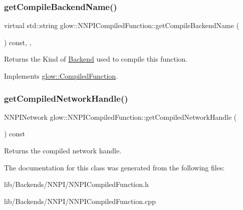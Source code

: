 \subsubsection{\texorpdfstring{get\+Compile\+Backend\+Name()}{getCompileBackendName()}}
{\footnotesize\ttfamily virtual std\+::string glow\+::\+N\+N\+P\+I\+Compiled\+Function\+::get\+Compile\+Backend\+Name (\begin{DoxyParamCaption}{ }\end{DoxyParamCaption}) const\hspace{0.3cm}{\ttfamily [inline]}, {\ttfamily [override]}, {\ttfamily [virtual]}}

\begin{DoxyReturn}{Returns}
the Kind of \hyperlink{classglow_1_1_backend}{Backend} used to compile this function. 
\end{DoxyReturn}


Implements \hyperlink{classglow_1_1_compiled_function_a7b3f2b17986d14706a1d1091d3c4df27}{glow\+::\+Compiled\+Function}.

\mbox{\label{classglow_1_1_n_n_p_i_compiled_function_a54cda1e7ddc8111a0c8754ac4e749399}} 
\subsubsection{\texorpdfstring{get\+Compiled\+Network\+Handle()}{getCompiledNetworkHandle()}}
{\footnotesize\ttfamily N\+N\+P\+I\+Network glow\+::\+N\+N\+P\+I\+Compiled\+Function\+::get\+Compiled\+Network\+Handle (\begin{DoxyParamCaption}{ }\end{DoxyParamCaption}) const\hspace{0.3cm}{\ttfamily [inline]}}

\begin{DoxyReturn}{Returns}
the compiled network handle. 
\end{DoxyReturn}


The documentation for this class was generated from the following files\+:\begin{DoxyCompactItemize}
\item 
lib/\+Backends/\+N\+N\+P\+I/N\+N\+P\+I\+Compiled\+Function.\+h\item 
lib/\+Backends/\+N\+N\+P\+I/N\+N\+P\+I\+Compiled\+Function.\+cpp\end{DoxyCompactItemize}
